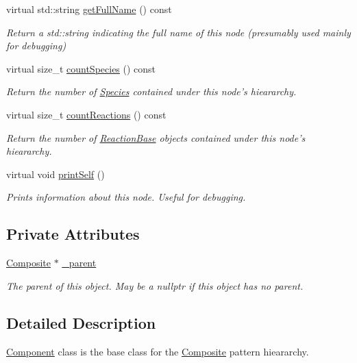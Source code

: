 \begin{DoxyCompactItemize}
virtual std\-::string \hyperlink{classchem_1_1Component_a1d5884d373fb44fd950d5fe2b0c34e26}{get\-Full\-Name} () const 
\begin{DoxyCompactList}\small\item\em Return a std\-::string indicating the full name of this node (presumably used mainly for debugging) \end{DoxyCompactList}\item 
virtual size\-\_\-t \hyperlink{classchem_1_1Component_a581a3912035ba493a2a24f1516d65ea8}{count\-Species} () const 
\begin{DoxyCompactList}\small\item\em Return the number of \hyperlink{classchem_1_1Species}{Species} contained under this node's hieararchy. \end{DoxyCompactList}\item 
virtual size\-\_\-t \hyperlink{classchem_1_1Component_ab061b8b7d97db554af402ebb9723dc4c}{count\-Reactions} () const 
\begin{DoxyCompactList}\small\item\em Return the number of \hyperlink{classchem_1_1ReactionBase}{Reaction\-Base} objects contained under this node's hieararchy. \end{DoxyCompactList}\item 
virtual void \hyperlink{classchem_1_1Component_a778911b6f9505f1d8a39fc39e093974e}{print\-Self} ()
\begin{DoxyCompactList}\small\item\em Prints information about this node. Useful for debugging. \end{DoxyCompactList}\end{DoxyCompactItemize}
\subsection*{Private Attributes}
\begin{DoxyCompactItemize}
\item 
\hyperlink{classchem_1_1Composite}{Composite} $\ast$ \hyperlink{classchem_1_1Component_a5da4c5a0d857620fe3e3cf7d8d06ec26}{\-\_\-parent}
\begin{DoxyCompactList}\small\item\em The parent of this object. May be a nullptr if this object has no parent. \end{DoxyCompactList}\end{DoxyCompactItemize}


\subsection{Detailed Description}
\hyperlink{classchem_1_1Component}{Component} class is the base class for the \hyperlink{classchem_1_1Composite}{Composite} pattern hieararchy. 

